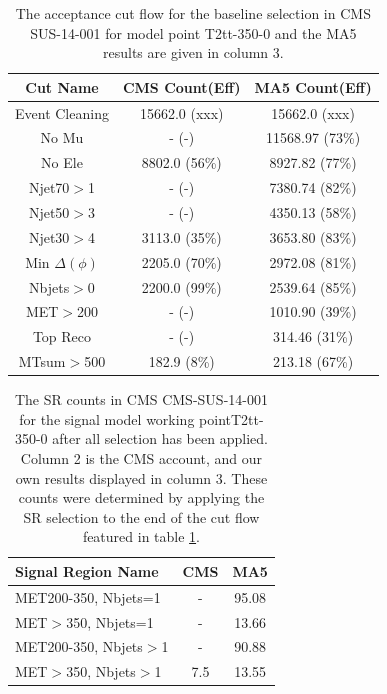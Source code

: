\begin{table}
    \centering
    \caption{The acceptance cut flow for the baseline selection in CMS SUS-14-001 for
    model point T2tt-350-0 and the MA5 results are given in column 3.}
    \begin{tabular}{  c | c | c  }
    \hline
    Cut Name & CMS Count(Eff) & MA5 Count(Eff)\\
    \hline
        Event Cleaning & 15662.0 (xxx) & 15662.0 (xxx)\\
    No Mu & - (-) & 11568.97 (73\%)\\
    No Ele & 8802.0 (56\%) & 8927.82 (77\%)\\
    Njet70$>$1 & - (-) & 7380.74 (82\%)\\
    Njet50$>$3 & - (-) & 4350.13 (58\%)\\
    Njet30$>$4 & 3113.0 (35\%) & 3653.80 (83\%)\\
    Min $\Delta(\phi)$ & 2205.0 (70\%) & 2972.08 (81\%)\\
    Nbjets$>$0 & 2200.0 (99\%) & 2539.64 (85\%)\\
    MET$>$200 & - (-) & 1010.90 (39\%)\\
    Top Reco & - (-) & 314.46 (31\%)\\
    MTsum$>$500 & 182.9 (8\%) & 213.18 (67\%)\\
\hline
    \end{tabular}
    \label{table:T2tt-350-0}
    
    \end{table}

    \begin{table}
    \centering
    \caption{The SR counts in CMS CMS-SUS-14-001 for
    the signal model working pointT2tt-350-0 after all selection has been applied. Column 2 is the CMS account,
    and our own results displayed in column 3. These counts were determined by applying the SR selection to the end of the cut flow featured in table \ref{table:T2tt-350-0}.}
    \begin{tabular}{  l | c | c  }
    \hline
    Signal Region Name & CMS & MA5\\
    \hline
    MET200-350,  Nbjets=1 & - & 95.08\\ 
 \hline 
MET$>$350,  Nbjets=1 & - & 13.66\\ 
 \hline 
MET200-350,  Nbjets$>$1 & - & 90.88\\ 
 \hline 
MET$>$350,  Nbjets$>$1 & 7.5 & 13.55\\ 
 \hline 
\hline
    \end{tabular}
    
    \end{table}
    
